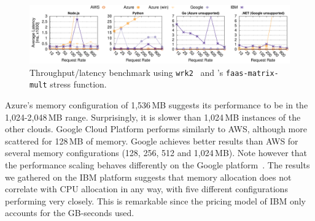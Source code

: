 \begin{figure}[!t]
\centering
\includegraphics[scale=0.7]{bilder/loadtest_average_latency/tputlat_combined}
\caption{Throughput/latency benchmark using \texttt{wrk2}~\cite{wrk2} and \sys's  \texttt{faas-matrix-mult} stress function.}
\label{fig:load_test_latency_all}
\end{figure}

Azure's memory configuration of 1,536\,\gls{MB} suggests its performance to be in the 1,024-2,048\,\gls{MB} range.
Surprisingly, it is slower than 1,024\,\gls{MB} instances of the other clouds.  
Google Cloud Platform performs similarly to \gls{AWS}, although more scattered for 128\,\gls{MB} of memory. 
Google achieves better results than \gls{AWS} for several memory configurations (128, 256, 512 and 1,024\,\gls{MB}). %
Note however that the performance scaling behaves differently on the Google platform~\cite{GoogleFunctionsPricing}.
The results we gathered on the \gls{IBM} platform suggests that memory allocation does not correlate with \gls{CPU} allocation in any way, with five different configurations performing very closely. 
This is remarkable since the pricing model of \gls{IBM} only accounts for the GB-seconds used. 

